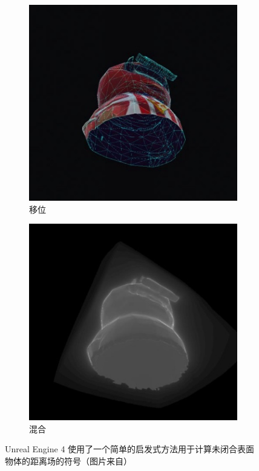 \begin{figure}
	\begin{subfigure}[b]{0.5\textwidth}
		\includegraphics[width=\textwidth]{figures/df/ue4-sign-1}
		\caption{移位}
	\end{subfigure}
	\begin{subfigure}[b]{0.5\textwidth}
		\includegraphics[width=\textwidth]{figures/df/ue4-sign-2}
		\caption{混合}
	\end{subfigure}
	\caption{Unreal Engine 4 使用了一个简单的启发式方法用于计算未闭合表面物体的距离场的符号（图片来自\cite{a:Dynamicocclusionwithsigneddistancefields}）}
	\label{f:df-ue4-sign}
\end{figure}




